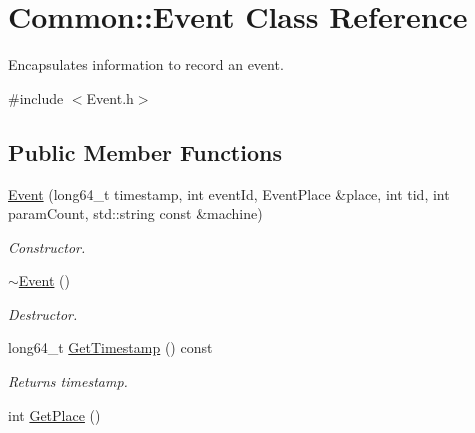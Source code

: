 \hypertarget{class_common_1_1_event}{\section{Common\-:\-:Event Class Reference}
\label{class_common_1_1_event}
}


Encapsulates information to record an event.  




{\ttfamily \#include $<$Event.\-h$>$}

\subsection*{Public Member Functions}
\begin{DoxyCompactItemize}
\item 
\hyperlink{class_common_1_1_event_a63afd3d081602539044c6ee3cc5cca54}{Event} (long64\-\_\-t timestamp, int event\-Id, Event\-Place \&place, int tid, int param\-Count, std\-::string const \&machine)
\begin{DoxyCompactList}\small\item\em Constructor. \end{DoxyCompactList}\item 
\hypertarget{class_common_1_1_event_aee9cb3b6f8e45fc94b04a684644b9893}{\hyperlink{class_common_1_1_event_aee9cb3b6f8e45fc94b04a684644b9893}{$\sim$\-Event} ()}\label{class_common_1_1_event_aee9cb3b6f8e45fc94b04a684644b9893}

\begin{DoxyCompactList}\small\item\em Destructor. \end{DoxyCompactList}\item 
\hypertarget{class_common_1_1_event_a6b8338c64703c64682432d27835742db}{long64\-\_\-t \hyperlink{class_common_1_1_event_a6b8338c64703c64682432d27835742db}{Get\-Timestamp} () const }\label{class_common_1_1_event_a6b8338c64703c64682432d27835742db}

\begin{DoxyCompactList}\small\item\em Returns timestamp. \end{DoxyCompactList}\item 
\hypertarget{class_common_1_1_event_afecf0af6bd52fd51203eac8f8bf07dc9}{int \hyperlink{class_common_1_1_event_afecf0af6bd52fd51203eac8f8bf07dc9}{Get\-Place} ()}\label{class_common_1_1_event_afecf0af6bd52fd51203eac8f8bf07dc9}


\end{DoxyCompactItemize}
